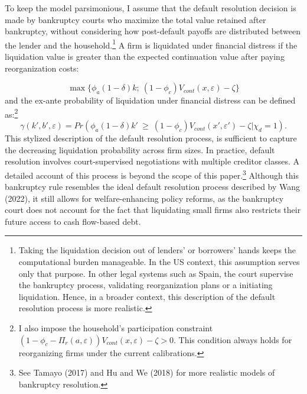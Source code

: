\documentclass[12pt]{article}
\begin{document}
To keep the model parsimonious, I assume that the default resolution decision is made by bankruptcy courts who maximize the total value retained after bankruptcy, without considering how post-default payoffs are distributed between the lender and the household.\footnote{Taking the liquidation decision out of lenders' or borrowers' hands keeps the computational burden manageable. In the US context, this assumption serves only that purpose. In other legal systems such as Spain, the court supervise the bankruptcy process, validating reorganization plans or a initiating liquidation. Hence, in a broader context, this description of the default resolution process is more realistic.} A firm is liquidated under financial distress if the liquidation value is greater than the expected continuation value after paying reorganization costs:

\begin{equation} \label{eq:liquidation decision}
 \max \{ \phi_a (1-\delta) k; \ (1-\phi_c) V_{cont}(x,\varepsilon)- \zeta\}
\end{equation}
and the ex-ante probability of liquidation under financial distress can be defined as:\footnote{I also impose the household's participation constraint $(1-\phi_c-\Pi_r(a,\varepsilon))V_{cont}(x,\varepsilon) - \zeta > 0$. This condition always holds for reorganizing firms under the current calibrations.} 
\begin{equation} \label{eq:liquidation probability}
    \gamma(k', b', \varepsilon) = Pr(\phi_a (1-\delta) k' \ \geq \ (1-\phi_c) V_{cont}(x',\varepsilon') - \zeta | \chi_d = 1).
\end{equation} 
This stylized description of the default resolution process, is sufficient to capture the decreasing liquidation probability across firm sizes. In practice, default resolution involves court-supervised negotiations with multiple creditor classes. A detailed account of this process is beyond the scope of this paper.\footnote{See Tamayo (2017) and Hu and We (2018) for more realistic models of bankruptcy resolution.} Although this bankruptcy rule resembles the ideal default resolution process described by Wang (2022), it still allows for welfare-enhancing policy reforms, as the bankruptcy court does not account for the fact that liquidating small firms also restricts their future access to cash flow-based debt.
\end{document}
